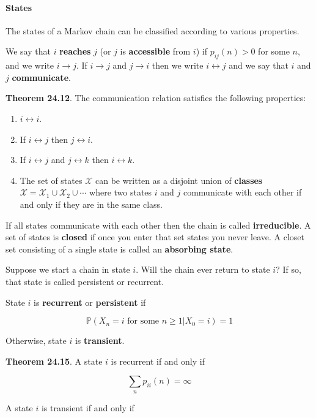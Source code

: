 \paragraph{States}\label{states}

The states of a Markov chain can be classified according to various
properties.

We say that \(i\) \textbf{reaches} \(j\) (or \(j\) is
\textbf{accessible} from \(i\)) if \(p_{ij}(n) > 0\) for some \(n\), and
we write \(i \rightarrow j\). If \(i \rightarrow j\) and
\(j \rightarrow i\) then we write \(i \leftrightarrow j\) and we say
that \(i\) and \(j\) \textbf{communicate}.

\textbf{Theorem 24.12}. The communication relation satisfies the
following properties:

\begin{enumerate}[tightlist,label={\arabic*.}]
\item
  \(i \leftrightarrow i\).
\item
  If \(i \leftrightarrow j\) then \(j \leftrightarrow i\).
\item
  If \(i \leftrightarrow j\) and \(j \leftrightarrow k\) then
  \(i \leftrightarrow k\).
\item
  The set of states \(\mathcal{X}\) can be written as a disjoint union
  of \textbf{classes}
  \(\mathcal{X} = \mathcal{X}_1 \cup \mathcal{X}_2 \cup \cdots\) where
  two states \(i\) and \(j\) communicate with each other if and only if
  they are in the same class.
\end{enumerate}

If all states communicate with each other then the chain is called
\textbf{irreducible}. A set of states is \textbf{closed} if once you
enter that set states you never leave. A closet set consisting of a
single state is called an \textbf{absorbing state}.

Suppose we start a chain in state \(i\). Will the chain ever return to
state \(i\)? If so, that state is called persistent or recurrent.

State \(i\) is \textbf{recurrent} or \textbf{persistent} if

\[ \mathbb{P}(X_n = i \text{ for some } n \geq 1 | X_0 = i) = 1 \]

Otherwise, state \(i\) is \textbf{transient}.

\textbf{Theorem 24.15}. A state \(i\) is recurrent if and only if

\[ \sum_n p_{ii}(n) = \infty \]

A state \(i\) is transient if and only if

